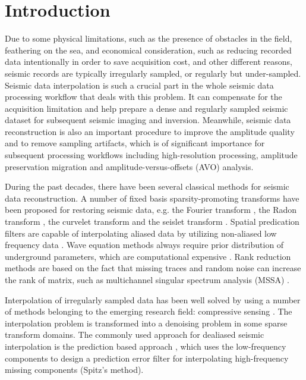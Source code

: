 
\section{Introduction} 
Due to some physical limitations, such as the presence of obstacles in the field, feathering on the sea, and economical consideration, such as reducing recorded data intentionally in order to save acquisition cost, and other different reasons, seismic records are typically irregularly sampled, or regularly but under-sampled. Seismic data interpolation is such a crucial part in the whole seismic data processing workflow that deals with this problem. It can compensate for the acquisition limitation and help prepare a dense and regularly sampled seismic dataset for subsequent seismic imaging and inversion.  Meanwhile, seismic data reconstruction is also an important procedure to improve the amplitude quality and to remove sampling artifacts, which is of significant importance for subsequent processing workflows including high-resolution processing, amplitude preservation migration and amplitude-versus-offsets (AVO) analysis.

During the past decades, there have been several classical methods for seismic data reconstruction. A number of fixed basis sparsity-promoting transforms have been proposed for restoring seismic data, e.g. the Fourier transform \cite{sacchi,naghizadehfourier,yangkang2014halfthr,yangkang2015eage2}, the Radon transform \cite{trad,yu,wangradon}, the curvelet transform \cite{herrmann,shahidi,liuwei2015} and the seislet transform \cite{seislet,shuwei20153,shuwei20164}.  Spatial predication filters are capable of interpolating aliased data by utilizing non-aliased low frequency data \cite{porsani}. Wave equation methods always require prior distribution of underground parameters, which are computational expensive \cite{ronen}. Rank reduction methods are based on the fact that missing traces and random noise can increase the rank of matrix, such as multichannel singular spectrum analysis (MSSA) \cite{oropezamssa,gaomssa}.

Interpolation of irregularly sampled data has been well solved by using a number of methods belonging to the emerging research field: compressive sensing \cite{donoho2006}. The interpolation problem is transformed into a denoising problem in some sparse transform domains. %
The commonly used approach for dealiased seismic interpolation is the prediction based approach \cite{spitz1991}, which uses the low-frequency components to design a prediction error filter for interpolating high-frequency missing components (Spitz's method). 

